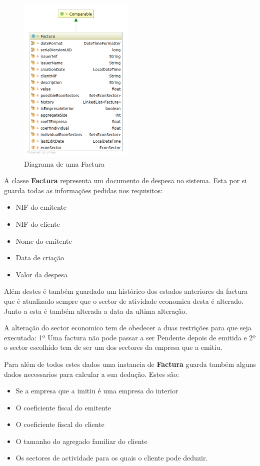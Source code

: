 \documentclass[12pt,a4paper]{report}
\begin{document}
    \begin{figure}
        \includegraphics[width=5.5cm]{./images/Factura.png}
        \caption{Diagrama de uma Factura}\label{fig:Factura}
    \end{figure}

    A classe \textbf{Factura} representa um documento de despesa no sistema.
    Esta por si guarda todas as informações pedidas nos requisitos:
    \begin{multicols}{2}
        \begin{itemize}
            \item NIF do emitente
            \item NIF do cliente
            \item Nome do emitente
            \item Data de criação
            \item Valor da despesa
        \end{itemize}
    \end{multicols}
    Além destes é também guardado um histórico dos estados anteriores da factura
    que é atualizado sempre que o sector de atividade economica desta é
    alterado. Junto a esta é também alterada a data da ultima alteração.

    A alteração do sector economico tem de obedecer a duas restrições para que
    seja executada: 1º Uma factura não pode passar a ser Pendente depois de
    emitida e 2º o sector escolhido tem de ser um dos sectores da empresa que a
    emitiu.

    Para além de todos estes dados uma instancia de \textbf{Factura} guarda
    também alguns dados necessarios para calcular a sua dedução. Estes são:
    \begin{itemize}
        \item Se a empresa que a imitiu é uma empresa do interior
        \item O coeficiente fiscal do emitente
        \item O coeficiente fiscal do cliente
        \item O tamanho do agregado familiar do cliente
        \item Os sectores de actividade para os quais o cliente
            pode deduzir.
    \end{itemize}
\end{document}
